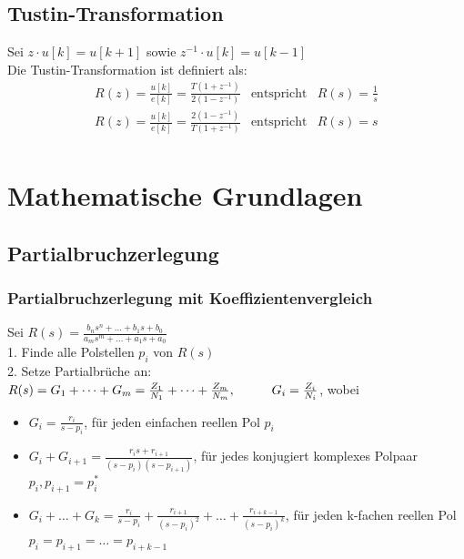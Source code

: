 \documentclass[10pt,a4paper]{article}
\renewcommand{\arraystretch}{1.5}
\newcommand{\tab}[1][1]{\hspace*{#1cm}}
\begin{document}
\subsection{Tustin-Transformation}
Sei $z ⋅ u[k] = u[k + 1]$ sowie $z^{-1} ⋅ u[k] = u[k-1]$ \\
Die Tustin-Transformation ist definiert als:
\renewcommand{\arraystretch}{2}
$$
	\begin{array}{lll}
		R(z) = \frac{u[k]}{e[k]} = \frac{T(1+z^{-1})}{2(1 - z^{-1})} & \text{entspricht} & R(s) = \frac 1 s \\
		R(z) = \frac{u[k]}{e[k]} = \frac{2(1-z^{-1})}{T(1 + z^{-1})} & \text{entspricht} & R(s) = s \\	
	\end{array}
$$
\renewcommand{\arraystretch}{1.5}





\appendix

\pagebreak
\section{Mathematische Grundlagen}
\subsection{Partialbruchzerlegung}
\subsubsection{Partialbruchzerlegung mit Koeffizientenvergleich}
Sei $R(s) = \frac{b_ns^n + \dots + b_1s + b_0}{a_ms^m + \dots + a_1s + a_0}$ \\

1. Finde alle Polstellen $p_i$ von $R(s)$ \\

2. Setze Partialbrüche an: \\
$R(s) = G_1 + \dots + G_m = \frac{Z_1}{N_1} + \dots + \frac{Z_m}{N_m}, \tab G_i = \frac{Z_i}{N_i}$, wobei
\begin{itemize}
	\item $G_i = \frac{r_i}{s - p_i}$, für jeden einfachen reellen Pol $p_i$
	\item $G_i + G_{i+1} = \frac{r_i s + r_{i + 1}}{(s - p_i)(s - p_{i + 1})}$, für jedes konjugiert komplexes Polpaar $p_i, p_{i+1} = p_i^*$
	\item $G_i + \dots + G_k = \frac{r_i}{s - p_i} + \frac{r_{i+1}}{(s - p_i)^2} + \dots + \frac{r_{i + k - 1}}{(s - p_i)^k}$, für jeden k-fachen reellen Pol $p_i = p_{i+1} = \dots = p_{i + k - 1}$
\end{itemize}
\end{document}

